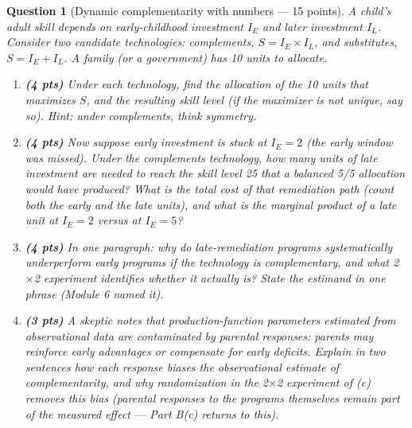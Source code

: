 \documentclass[11pt]{article}
\newtheorem{question}{Question}
\begin{document}
\begin{question}[Dynamic complementarity with numbers --- 15 points]
A child's adult skill depends on early-childhood investment $I_E$ and
later investment $I_L$. Consider two candidate technologies:
\emph{complements}, $S = I_E \times I_L$, and \emph{substitutes},
$S = I_E + I_L$. A family (or a government) has 10 units to allocate.

\begin{enumerate}[label=(\alph*)]
  \item \textbf{(4 pts)} Under each technology, find the allocation of
        the 10 units that maximizes $S$, and the resulting skill level
        (if the maximizer is not unique, say so).
        \emph{Hint: under complements, think symmetry.}
  \item \textbf{(4 pts)} Now suppose early investment is stuck at
        $I_E = 2$ (the early window was missed). Under the complements
        technology, how many units of late investment are needed to
        reach the skill level 25 that a balanced 5/5 allocation would
        have produced? What is the total cost of that remediation path
        (count both the early and the late units), and what is the
        marginal product of a late unit at $I_E = 2$ versus at
        $I_E = 5$?
  \item \textbf{(4 pts)} In one paragraph: why do late-remediation
        programs systematically underperform early programs \emph{if}
        the technology is complementary, and what 2$\times$2 experiment
        identifies whether it actually is? State the estimand in one
        phrase (Module 6 named it).
  \item \textbf{(3 pts)} A skeptic notes that production-function
        parameters estimated from observational data are contaminated
        by \emph{parental responses}: parents may reinforce early
        advantages or compensate for early deficits. Explain in two
        sentences how each response biases the observational estimate
        of complementarity, and why randomization in the 2$\times$2
        experiment of (c) removes this bias (parental responses to the
        programs themselves remain part of the measured effect ---
        Part B(c) returns to this).
\end{enumerate}
\end{question}
\end{document}
